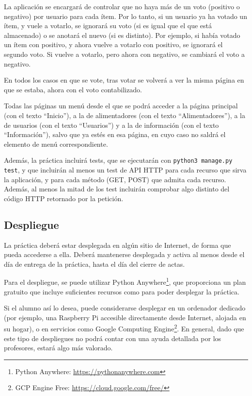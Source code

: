 La aplicación se encargará de controlar que no haya más de un voto (positivo o negativo) por usuario para cada ítem. Por lo tanto, si un usuario ya ha votado un ítem, y vuele a votarlo, se ignorará su voto (si es igual que el que está almacenado) o se anotará el nuevo (si es distinto). Por ejemplo, si había votado un ítem con positivo, y ahora vuelve a votarlo con positivo, se ignorará el segundo voto. Si vuelve a votarlo, pero ahora con negativo, se cambiará el voto a negativo.

En todos los casos en que se vote, tras votar se volverá a ver la misma página en que se estaba, ahora con el voto contabilizado.

Todas las páginas un menú desde el que se podrá acceder a la página principal (con el texto ``Inicio''), a la de alimentadores (con el texto ``Alimentadores''), a la de usuarios (con el texto ``Usuarios'') y a la de información (con el texto ``Información''), salvo que ya estés en esa página, en cuyo caso no saldrá el elemento de menú correspondiente.

Además, la práctica incluirá tests, que se ejecutarán con \verb|python3 manage.py test|, y que incluirán al menos un test de API HTTP para cada recurso que sirva la aplicación, y para cada método (GET, POST) que admita cada recurso. Además, al menos la mitad de los test incluirán comprobar algo distinto del código HTTP retornado por la petición.

\subsection{Despliegue}

La práctica deberá estar desplegada en algún sitio de Internet, de forma que pueda accederse a ella. Deberá mantenerse desplegada y activa al menos desde el día de entrega de la práctica, hasta el día del cierre de actas.

Para el despliegue, se puede utilizar Python Anywhere\footnote{Python Anywhere: \url{https://pythonanywhere.com}}, que proporciona un plan gratuito que incluye suficientes recursos como para poder desplegar la práctica.

Si el alumno así lo desea, puede considerarse desplegar en un ordenador dedicado (por ejemplo, una Raspberry Pi accesible directamente desde Internet, alojada en su hogar), o en servicios como Google Computing Engine\footnote{GCP Engine Free: \url{https://cloud.google.com/free/}}. En general, dado que este tipo de despliegues no podrá contar con una ayuda detallada por los profesores, estará algo más valorado.

